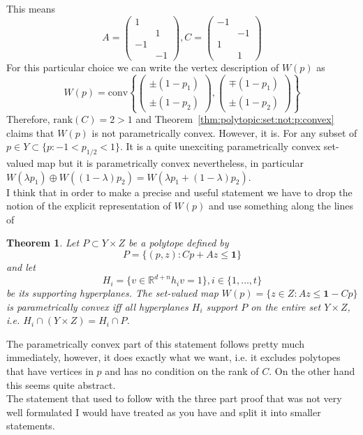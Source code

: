 \documentclass[a4paper]{scrartcl}
\providecommand{\conv}{\text{conv}}
\providecommand{\rank}{\text{rank}}
\newtheorem{theorem}{Theorem}
\begin{document}
%
This means 
%
\[
A = \begin{pmatrix}1& \\ &1 \\ -1& \\ &-1\end{pmatrix}, C = \begin{pmatrix} -1& \\ &-1  \\ 1& \\ &1\end{pmatrix}
\]
% 
For this particular choice we can write the vertex description of $W(p)$ as
%
\[
	W(p) = \conv \left\{ \begin{pmatrix}\pm(1-p_1)\\\pm (1-p_2)\end{pmatrix},\begin{pmatrix}\mp(1-p_1)\\\pm (1-p_2)\end{pmatrix}\right\}
\]
%
Therefore, $\rank(C)=2>1$ and Theorem~\ref{thm:polytopic:set:not:p:convex} claims that $W(p)$ is not parametrically convex. 
%
However, it is. 
%
For any subset of $p\in Y\subset \{p:-1<p_{1/2}<1\}$. 
%
It is a quite unexciting parametrically convex set-valued map but it is parametrically convex nevertheless, in particular $W(\lambda p_1) \oplus W((1-\lambda)p_2) = W(\lambda p_1+(1-\lambda)p_2)$.
%
\\[2em]
%
I think that in order to make a precise and useful statement we have to drop the notion of the explicit representation of $W(p)$ and use something along the lines of
%
\begin{theorem}
Let $P\subset Y\times Z$ be a polytope defined by
%
\[
	P = \{(p,z):Cp+Az\leq\mathbf{1}\}
\] 
%
and let 
%
\[
H_i = \{v\in\mathbb R^{d+n}h_iv=1\}, i\in\{1,\dots,t\}
\]
be its supporting hyperplanes.
%
The set-valued map $W(p) = \{z\in Z:Az\leq\mathbf{1}-Cp\}$ is parametrically convex iff all hyperplanes $H_i$ support $P$ on the entire set $Y\times Z$, i.e. $H_i\cap (Y\times Z) = H_i\cap P$.
\end{theorem}
%
The parametrically convex part of this statement follows pretty much immediately, however, it does exactly what we want, i.e. it excludes polytopes that have vertices in $p$ and has no condition on the rank of $C$.
%
On the other hand this seems quite abstract.
%
\\[2em]
%
The statement that used to follow with the three part proof that was not very well formulated I would have treated as you have and split it into smaller statements.
%
\end{document}

